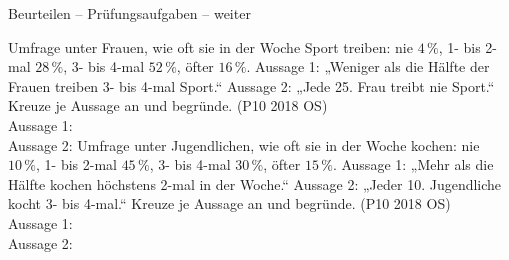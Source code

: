 \begin{aufgabe}{Beurteilen – Prüfungsaufgaben – weiter}
\begin{teile}
\steil Umfrage unter Frauen, wie oft sie in der Woche Sport treiben: nie $4\,\%$, 1- bis 2-mal $28\,\%$, 3- bis 4-mal $52\,\%$, öfter $16\,\%$. Aussage 1: „Weniger als die Hälfte der Frauen treiben 3- bis 4-mal Sport.“ Aussage 2: „Jede 25. Frau treibt nie Sport.“ Kreuze je Aussage an und begründe. \hfill (P10 2018 OS)\\ Aussage 1:    \\ Aussage 2:   
\steil Umfrage unter Jugendlichen, wie oft sie in der Woche kochen: nie $10\,\%$, 1- bis 2-mal $45\,\%$, 3- bis 4-mal $30\,\%$, öfter $15\,\%$. Aussage 1: „Mehr als die Hälfte kochen höchstens 2-mal in der Woche.“ Aussage 2: „Jeder 10. Jugendliche kocht 3- bis 4-mal.“ Kreuze je Aussage an und begründe. \hfill (P10 2018 OS)\\ Aussage 1:    \\ Aussage 2:   
\end{teile}
\end{aufgabe}
